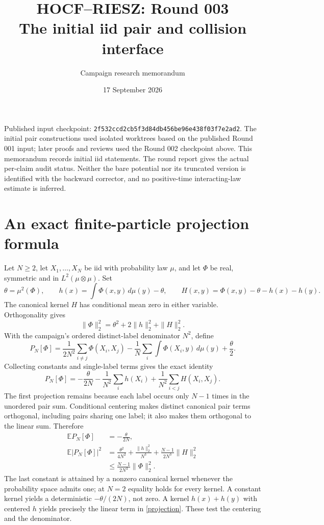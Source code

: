 \documentclass[11pt]{article}
\title{HOCF--RIESZ: Round 003\\The initial iid pair and collision interface}
\author{Campaign research memorandum}
\date{17 September 2026}
\newcommand{\E}{\mathbb E}
\begin{document}
\maketitle
\noindent Published input checkpoint:
\texttt{2f532ccd2cb5f3d84db456be96e438f03f7e2ad2}.
The initial pair constructions used isolated worktrees based on the
published Round 001 input; later proofs and reviews used the Round 002
checkpoint above. This memorandum records initial iid statements. The round
report gives the actual per-claim audit status. Neither the bare potential
nor its truncated version is identified with the backward corrector, and
no positive-time interacting-law estimate is inferred.

\section{An exact finite-particle projection formula}
Let $N\ge2$, let $X_1,\ldots,X_N$ be iid with probability law $\mu$, and let
$\Phi$ be real, symmetric and in $L^2(\mu\otimes\mu)$. Set
\[
 \theta=\mu^2(\Phi),\qquad
 h(x)=\int\Phi(x,y)\,d\mu(y)-\theta,\qquad
 H(x,y)=\Phi(x,y)-\theta-h(x)-h(y).
\]
The canonical kernel $H$ has conditional mean zero in either variable.
Orthogonality gives
\[
 \|\Phi\|_2^2=\theta^2+2\|h\|_2^2+\|H\|_2^2.
\]
With the campaign's ordered distinct-label denominator $N^2$, define
\[
 P_N[\Phi]=\frac1{2N^2}\sum_{i\ne j}\Phi(X_i,X_j)
       -\frac1N\sum_i\int\Phi(X_i,y)\,d\mu(y)+\frac\theta2.
\]
Collecting constants and single-label terms gives the exact identity
\begin{equation}\label{projection}
 P_N[\Phi]=-\frac\theta{2N}
      -\frac1{N^2}\sum_i h(X_i)
      +\frac1{N^2}\sum_{i<j}H(X_i,X_j).
\end{equation}
The first projection remains because each label occurs only $N-1$ times
in the unordered pair sum. Conditional centering makes distinct canonical
pair terms orthogonal, including pairs sharing one label; it also makes
them orthogonal to the linear sum. Therefore
\begin{align}
 \E P_N[\Phi]&=-\frac\theta{2N},\label{mean}\\
 \E|P_N[\Phi]|^2
 &=\frac{\theta^2}{4N^2}+\frac{\|h\|_2^2}{N^3}
       +\frac{N-1}{2N^3}\|H\|_2^2\label{moment}\\
 &\le\frac{N-1}{2N^3}\|\Phi\|_2^2.\label{bound}
\end{align}
The last constant is attained by a nonzero canonical kernel whenever the
probability space admits one; at $N=2$ equality holds for every kernel.
A constant kernel yields a deterministic $-\theta/(2N)$, not zero.
A kernel $h(x)+h(y)$ with centered $h$ yields precisely the linear term in
\eqref{projection}. These test the centering and the denominator.
\end{document}

